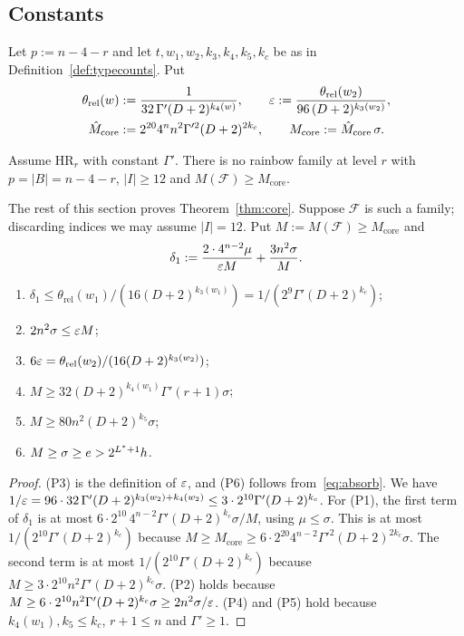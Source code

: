 \subsection{Constants}
Let $p:=n-4-r$ and let $t,w_1,w_2,k_3,k_4,k_5,k_c$ be as in Definition~\ref{def:typecounts}. Put
\begin{gather*}
\theta_{\mathrm{rel}}(w):=\frac{1}{32\,\Gamma'(D+2)^{k_4(w)}},\qquad
\varepsilon:=\frac{\theta_{\mathrm{rel}}(w_2)}{96\,(D+2)^{k_3(w_2)}},\\
\hat M_{\mathrm{core}}:=2^{20}4^nn^2\Gamma'^2(D+2)^{2k_c},\qquad M_{\mathrm{core}}:=\hat M_{\mathrm{core}}\,\sigma .
\end{gather*}

\begin{theorem}\label{thm:core}
Assume HR$_r$ with constant $\Gamma'$. There is no rainbow family at level $r$ with $p=|B|=n-4-r$, $|I|\ge12$ and
$M(\mathcal F)\ge M_{\mathrm{core}}$.
\end{theorem}

The rest of this section proves Theorem~\ref{thm:core}. Suppose $\mathcal F$ is such a family; discarding indices
we may assume $|I|=12$. Put $M:=M(\mathcal F)\ge M_{\mathrm{core}}$ and
\[
\delta_1:=\frac{2\cdot4^{n-2}\mu}{\varepsilon M}+\frac{3n^2\sigma}{M}.
\]

\begin{lemma}\label{lem:params-core}
\begin{enumerate}[label=(P\arabic*)]
\item $\delta_1\le\theta_{\mathrm{rel}}(w_1)/(16(D+2)^{k_3(w_1)})=1/(2^9\Gamma'(D+2)^{k_c})$;
\item $2n^2\sigma\le\varepsilon M$;
\item $6\varepsilon=\theta_{\mathrm{rel}}(w_2)/(16(D+2)^{k_3(w_2)})$;
\item $M\ge32(D+2)^{k_4(w_1)}\Gamma'(r+1)\sigma$;
\item $M\ge80n^2(D+2)^{k_5}\sigma$;
\item $M\ge\sigma\ge e>2^{L^{\ast}+1}h$.
\end{enumerate}
\end{lemma}
\begin{proof}
(P3) is the definition of $\varepsilon$, and (P6) follows from~\eqref{eq:absorb}. We have
$1/\varepsilon=96\cdot32\,\Gamma'(D+2)^{k_3(w_2)+k_4(w_2)}\le3\cdot2^{10}\Gamma'(D+2)^{k_c}$. For (P1), the first term of
$\delta_1$ is at most $6\cdot2^{10}\,4^{n-2}\Gamma'(D+2)^{k_c}\sigma/M$, using $\mu\le\sigma$. This is at most
$1/(2^{10}\Gamma'(D+2)^{k_c})$ because $M\ge M_{\mathrm{core}}\ge6\cdot2^{20}4^{n-2}\Gamma'^2(D+2)^{2k_c}\sigma$. The
second term is at most $1/(2^{10}\Gamma'(D+2)^{k_c})$ because $M\ge3\cdot2^{10}n^2\Gamma'(D+2)^{k_c}\sigma$.
(P2) holds because $M\ge6\cdot2^{10}n^2\Gamma'(D+2)^{k_c}\sigma\ge2n^2\sigma/\varepsilon$. (P4) and (P5) hold because
$k_4(w_1),k_5\le k_c$, $r+1\le n$ and $\Gamma'\ge1$.
\end{proof}

